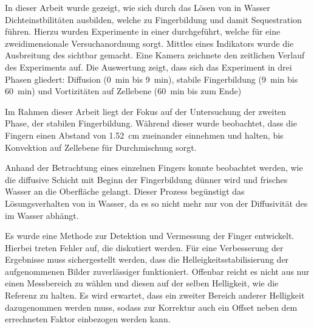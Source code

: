 
\label{cha:con}

In dieser Arbeit wurde gezeigt, wie sich durch das Lösen von \COT in Wasser Dichteinstbilitäten ausbilden, welche zu Fingerbildung und damit \COTm Sequestration führen. 
Hierzu wurden Experimente in einer \HSC durchgeführt, welche für eine zweidimensionale Versuchanordnung sorgt. Mittles eines Indikators wurde die Ausbreitung des \COT sichtbar gemacht. Eine Kamera zeichnete den zeitlichen Verlauf des Experiments auf.
Die Auswertung zeigt, dass sich das Experiment in drei Phasen gliedert: 
 Diffusion (\SI{0}{\minute} bis \SI{9}{\minute}),
 stabile Fingerbildung (\SI{9}{\minute} bis \SI{60}{\minute}) und
 Vortizitäten auf Zellebene (\SI{60}{\minute} bis zum Ende) 

Im Rahmen dieser Arbeit liegt der Fokus auf der Untersuchung der zweiten Phase, der stabilen Fingerbildung. Während dieser wurde beobachtet, dass die Fingern einen Abstand von \SI[round-precision=2]{1.52}{\centi\meter} zueinander einnehmen und halten, bis Konvektion auf Zellebene für Durchmischung sorgt.

Anhand der Betrachtung eines einzelnen Fingers konnte beobachtet werden, wie die diffusive Schicht mit Beginn der Fingerbildung dünner wird und frisches Wasser an die Oberfläche gelangt. Dieser Prozess begünstigt das Lösungsverhalten von \COT in Wasser, da es so nicht mehr nur von der Diffusivität des \COT im Wasser abhängt. 

Es wurde eine Methode zur Detektion und Vermessung der Finger entwickelt. Hierbei treten Fehler auf, die diskutiert werden. Für eine Verbesserung der Ergebnisse muss sichergestellt werden, dass die Helleigkeitsstabilisierung der aufgenommenen Bilder zuverlässiger funktioniert. Offenbar reicht es nicht aus nur einen Messbereich zu wählen und diesen auf der selben Helligkeit, wie die Referenz zu halten. Es wird erwartet, dass ein zweiter Bereich anderer Helligkeit dazugenommen werden muss, sodass zur Korrektur auch ein Offset neben dem errechneten Faktor einbezogen werden kann.




